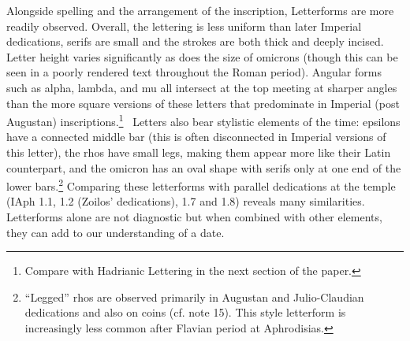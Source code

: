 \documentclass[amsthm,ebook]{saparticle}
\begin{document}
Alongside spelling and the arrangement of the inscription, Letterforms are more readily observed. Overall, the lettering
is less uniform than later Imperial dedications, serifs are small and the strokes are both thick and deeply incised.
Letter height varies significantly as does the size of omicrons (though this can be seen in a poorly rendered text
throughout the Roman period). Angular forms such as alpha, lambda, and mu all intersect at the top meeting at sharper
angles than the more square versions of these letters that predominate in Imperial (post Augustan)
inscriptions.\footnote{ Compare with Hadrianic Lettering in the next section of the paper.} \ Letters also bear
stylistic elements of the time: epsilons have a connected middle bar (this is often disconnected in Imperial versions
of this letter), the rhos have small legs, making them appear more like their Latin counterpart, and the omicron has an
oval shape with serifs only at one end of the lower bars.\footnote{ ``Legged'' rhos are observed primarily in Augustan
and Julio-Claudian dedications and also on coins (cf. note 15). This style letterform is increasingly less common after
Flavian period at Aphrodisias. } Comparing these letterforms with parallel dedications at the temple (IAph 1.1, 1.2
(Zoilos’ dedications), 1.7 and 1.8) reveals many similarities. Letterforms alone are not diagnostic but when combined
with other elements, they can add to our understanding of a date. 
\end{document}
